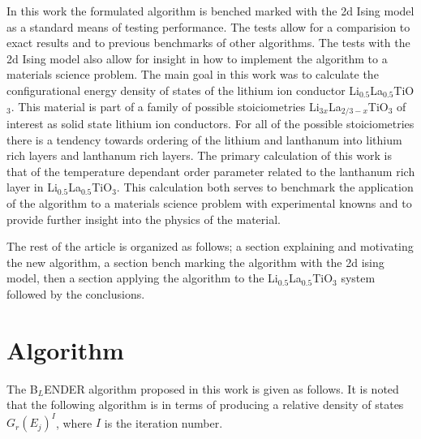 \documentclass[aps,prl,reprint,superscriptaddress,showkeys]{revtex4-1}
\begin{document}
   In this work the formulated algorithm is benched marked with the 2d Ising model as a standard means of testing  performance.  The tests allow for a comparision to exact results and to previous benchmarks of other algorithms. The tests with the 2d Ising model also allow for insight in how to implement the algorithm to a materials science problem. The main goal in this work  was to calculate the configurational energy density of states of the lithium ion conductor Li$_{0.5}$La$_{0.5}$TiO$_3$.  This material is part of a family of possible stoiciometries Li$_{3x}$La$_{2/3 -x}$TiO$_3$ of interest as solid state lithium ion conductors\cite{domainboundaries,P4mmmstrucuture,imaginary_phonons,GENG2009555,peculiarities,LLTOreview,Li_La_ordering_computational}. For all of the possible stoiciometries there is a tendency towards ordering of the lithium and lanthanum into lithium rich layers and lanthanum rich layers.  The primary calculation of this work is that of the temperature dependant order parameter related to the lanthanum rich layer in Li$_{0.5}$La$_{0.5}$TiO$_3$. This calculation both serves to benchmark the application of the algorithm to a materials science problem with experimental knowns and to provide further insight into the physics of the material. 
   
   The rest of the article is organized as follows; a section explaining and motivating the new algorithm, a section bench marking the algorithm with the 2d ising model, then a section applying the algorithm to the Li$_{0.5}$La$_{0.5}$TiO$_3$ system followed by the conclusions. 

\section{Algorithm}
   
The B$_{L}$ENDER algorithm proposed in this work  is given as follows. It is noted that the following algorithm is in terms of producing a relative density of states $G_{r}(E_j)^I$, where $I$ is the iteration number. 
\end{document}
